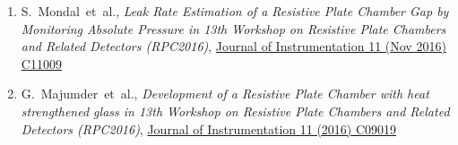 \documentclass[12pt]{article}
\begin{document}
\begin{justify}
\begin{enumerate}[b.]
\begin{enumerate}[1.]
  \item S.~Mondal~et~al., \emph{Leak Rate Estimation of a Resistive Plate Chamber Gap by Monitoring Absolute Pressure in 13th Workshop on Resistive Plate Chambers and Related Detectors (RPC2016)}, \href{https://doi.org/10.1088/1748-0221/11/11/C11009}{Journal of Instrumentation 11 (Nov 2016) C11009}
  \item  G.~Majumder~et~al., \emph{Development of a Resistive Plate Chamber with heat strengthened glass in 13th Workshop on Resistive Plate Chambers and Related Detectors (RPC2016)}, \href{https://doi.org/10.1088/1748-0221/11/09/C09019}{Journal of Instrumentation 11 (2016) C09019}
  \end{enumerate}
\end{enumerate}
\end{justify}

\newpage
\end{document}

